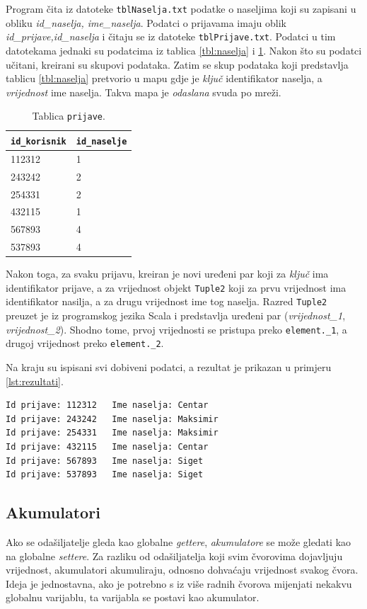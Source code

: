 \documentclass[times, utf8, zavrsni, numeric]{fer}
\begin{document}
Program čita iz datoteke \texttt{tblNaselja.txt} podatke o naseljima koji su zapisani u obliku \emph{id\_naselja, ime\_naselja}. Podatci o prijavama imaju oblik \emph{id\_prijave,id\_naselja} i čitaju se iz datoteke \texttt{tblPrijave.txt}. Podatci u tim datotekama jednaki su podatcima iz tablica \ref{tbl:naselja} i \ref{tbl:prijave}. Nakon što su podatci učitani, kreirani su skupovi podataka. Zatim se skup podataka koji predstavlja tablicu \ref{tbl:naselja} pretvorio u mapu gdje je \emph{ključ} identifikator naselja, a \emph{vrijednost} ime naselja. Takva mapa je \emph{odaslana} svuda po mreži. 

\begin{table}[htb]
\caption{Tablica \texttt{prijave}.}
\label{tbl:prijave}
\centering
\begin{tabular}{ll} 
\hline
\texttt{id\_korisnik} & \texttt{id\_naselje}\\
\hline
112312 & 1\\
243242 & 2\\
254331 & 2\\
432115 & 1\\
567893 & 4\\
537893 & 4\\
\hline
\end{tabular}
\end{table}

Nakon toga, za svaku prijavu, kreiran je novi uređeni par koji za \emph{ključ} ima identifikator prijave, a za vrijednost objekt \texttt{Tuple2} koji za prvu vrijednost ima identifikator nasilja, a za drugu vrijednost ime tog naselja. Razred \texttt{Tuple2} preuzet je iz programskog jezika Scala i predstavlja uređeni par (\emph{vrijednost\_1}, \emph{vrijednost\_2}). Shodno tome, prvoj vrijednosti se pristupa preko \texttt{element.\_1}, a drugoj vrijednost preko \texttt{element.\_2}.

Na kraju su ispisani svi dobiveni podatci, a rezultat je prikazan u primjeru \ref{lst:rezultati}.
\begin{lstlisting}[label={lst:rezultati}, caption={Identifikatori prijave i imena naselja odakle su prijave poslane.}]
Id prijave: 112312 	 Ime naselja: Centar
Id prijave: 243242 	 Ime naselja: Maksimir
Id prijave: 254331 	 Ime naselja: Maksimir
Id prijave: 432115 	 Ime naselja: Centar
Id prijave: 567893 	 Ime naselja: Siget
Id prijave: 537893 	 Ime naselja: Siget
\end{lstlisting}

\subsection{Akumulatori}
Ako se odašiljatelje gleda kao globalne \emph{gettere}, \emph{akumulatore}  se može gledati kao na globalne \emph{settere}. Za razliku od odašiljatelja koji svim čvorovima dojavljuju vrijednost, akumulatori akumuliraju, odnosno dohvaćaju vrijednost svakog čvora. Ideja je jednostavna, ako je potrebno s iz više radnih čvorova mijenjati nekakvu globalnu varijablu, ta varijabla se postavi kao akumulator.
\end{document}
